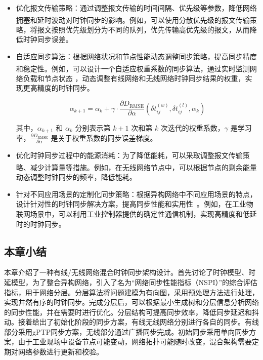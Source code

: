 \documentclass[UTF8,a4paper,12pt]{ctexart}
\numberwithin{equation}{section}
\begin{document}
\begin{itemize}
	\item 优化报文传输策略：通过调整报文传输的时间间隔、优先级等参数，降低网络拥塞和延时波动对时钟同步的影响\textsuperscript{\cite{mizrahi2012slave}}。例如，可以使用分散优先级的报文传输策略，将报文按照优先级划分为不同的队列，优先传输高优先级的报文，从而降低时钟同步误差。
	\item 自适应同步算法：根据网络状况和节点性能动态调整同步策略，提高同步精度和稳定性\textsuperscript{\cite{fradkov1997adaptive}}。例如，可以设计一个自适应权重系数的同步算法，通过实时监测网络负载和节点状态
	，动态调整有线网络和无线网络时钟同步结果的权重，实现更高精度的时钟同步。
	
	\begin{equation}
		\alpha_{k+1} = \alpha_k + \gamma \cdot \frac{\partial D_\text{RMSE}}{\partial \alpha} (\delta t_{ij}^{(w)}, \delta t_{ij}^{(l)}, \alpha_k)
	\end{equation}
	
	其中，$\alpha_{k+1}$ 和 $\alpha_k$ 分别表示第 $k+1$ 次和第 $k$ 次迭代的权重系数，$\gamma$ 是学习率，$\frac{\partial D_\text{RMSE}}{\partial \alpha}$ 是关于权重系数的同步误差梯度。
	
	\item 优化时钟同步过程中的能源消耗：为了降低能耗，可以采取调整报文传输策略、减少计算量等措施\textsuperscript{\cite{xue2021wicsync}}。例如，在无线网络节点中，可以根据节点的剩余能量动态调整时钟同步的频率，降低能耗。
	
	\item 针对不同应用场景的定制化同步策略：根据异构网络中不同应用场景的特点，设计针对性的时钟同步解决方案，提高同步性能和实用性~\cite{19}。例如，在工业物联网场景中，可以利用工业控制器提供的确定性通信机制，实现高精度和低延时的时钟同步。
	
\end{itemize}




\subsection{本章小结}
本章介绍了一种有线/无线网络混合时钟同步架构设计。首先讨论了时钟模型、时延模型，为了整合异构网络，引入了名为“网络同步性能指标（NSPI）”的综合评估指标，用于网络分层。分层算法将问题建模为有向图，采用预处理方法进行处理，实现井然有序的时钟同步。完成分层后，可以根据最小生成树和分层信息分析网络的同步性能，并在需要时进行优化。分层结构可提高同步效率，降低同步延迟和抖动。接着给出了初始化阶段的同步方案，有线无线网络分别进行各自的同步。有线部分采用gPTP同步方案，无线部分通过广播同步完成。初始同步采用单向同步方案，由于工业现场中设备节点可能变动，网络拓扑可能随时改变，混合架构需要定期对网络参数进行更新和校验。
\end{document}
